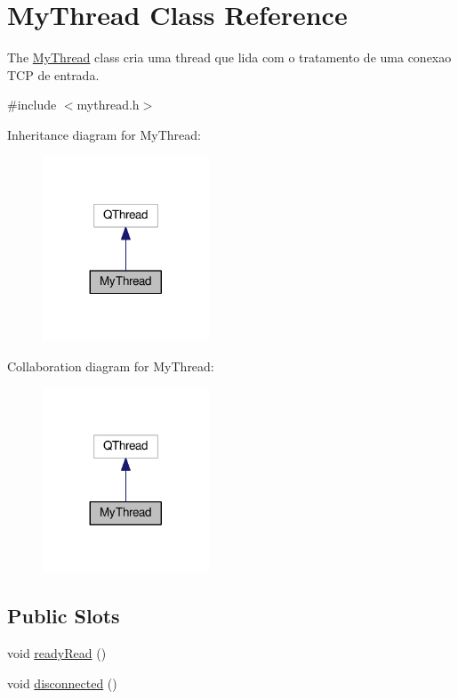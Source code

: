 \hypertarget{class_my_thread}{}\section{My\+Thread Class Reference}
\label{class_my_thread}


The \hyperlink{class_my_thread}{My\+Thread} class cria uma thread que lida com o tratamento de uma conexao T\+CP de entrada.  




{\ttfamily \#include $<$mythread.\+h$>$}



Inheritance diagram for My\+Thread\+:
\nopagebreak
\begin{figure}[H]
\begin{center}
\leavevmode
\includegraphics[width=140pt]{class_my_thread__inherit__graph}
\end{center}
\end{figure}


Collaboration diagram for My\+Thread\+:
\nopagebreak
\begin{figure}[H]
\begin{center}
\leavevmode
\includegraphics[width=140pt]{class_my_thread__coll__graph}
\end{center}
\end{figure}
\subsection*{Public Slots}
\begin{DoxyCompactItemize}
\item 
void \hyperlink{class_my_thread_a277618fdd448b927f2e250c2076fc176}{ready\+Read} ()
\item 
void \hyperlink{class_my_thread_a447710039787ae20134a9b572487840f}{disconnected} ()
\end{DoxyCompactItemize}
